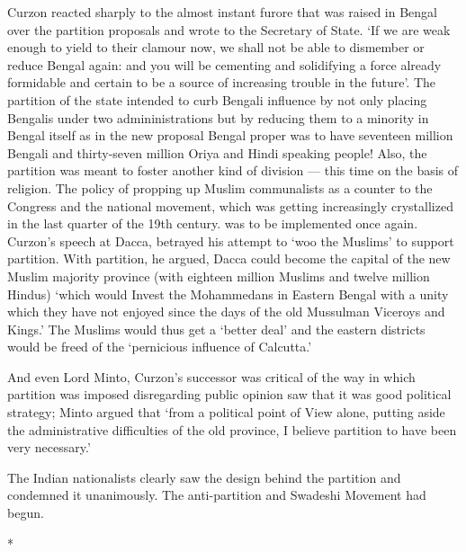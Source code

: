 Curzon reacted sharply to the almost instant furore that was raised in Bengal over the partition proposals and wrote to the Secretary of State. `If we are weak enough to yield to their clamour now, we shall not be able to dismember or reduce Bengal again: and you will be cementing and solidifying a force already formidable and certain to be a source of increasing trouble in the future'. The partition of the state intended to curb Bengali influence by not only placing Bengalis under two admininistrations but by reducing them to a minority in Bengal itself as in the new proposal Bengal proper was to have seventeen million Bengali and thirty-seven million Oriya and Hindi speaking people! Also, the partition was meant to foster another kind of division --- this time on the basis of religion. The policy of propping up Muslim communalists as a counter to the Congress and the national movement, which was getting increasingly crystallized in the last quarter of the 19th century. was to be implemented once again. Curzon's speech at Dacca, betrayed his attempt to `woo the Muslims' to support partition. With partition, he argued, Dacca could become the capital of the new Muslim majority province (with eighteen million Muslims and twelve million Hindus) `which would Invest the Mohammedans in Eastern Bengal with a unity which they have not enjoyed since the days of the old Mussulman Viceroys and Kings.' The Muslims would thus get a `better deal' and the eastern districts would be freed of the `pernicious influence of Calcutta.'

And even Lord Minto, Curzon's successor was critical of the way in which partition was imposed disregarding public opinion saw that it was good political strategy; Minto argued that `from a political point of View alone, putting aside the administrative difficulties of the old province, I believe partition to have been very necessary.'

The Indian nationalists clearly saw the design behind the partition and condemned it unanimously. The anti-partition and Swadeshi Movement had begun.

\begin{center}*\end{center}

\paragraph*{}

